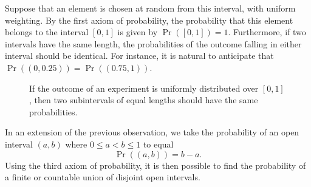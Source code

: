 Suppose that an element is chosen at random from this interval, with uniform weighting.
By the first axiom of probability, the probability that this element belongs to the interval $[0,1]$ is given by $\Pr \left( [0,1] \right) = 1$.
Furthermore, if two intervals have the same length, the probabilities of the outcome falling in either interval should be identical.
For instance, it is natural to anticipate that $\Pr \left( \left( 0, 0.25 \right) \right) = \Pr \left( \left( 0.75, 1 \right) \right)$.

\begin{figure}[htb!]
\begin{center}
\begin{footnotesize}
\end{footnotesize}
\caption{If the outcome of an experiment is uniformly distributed over $[0,1]$, then two subintervals of equal lengths should have the same probabilities.}
\end{center}
\end{figure}

In an extension of the previous observation, we take the probability of an open interval $(a, b)$ where $0 \leq a < b \leq 1$ to equal
\begin{equation} \label{equation:DefinitionProbabilityLaw1}
\Pr ( (a,b) ) = b - a .
\end{equation}
Using the third axiom of probability, it is then possible to find the probability of a finite or countable union of disjoint open intervals.

